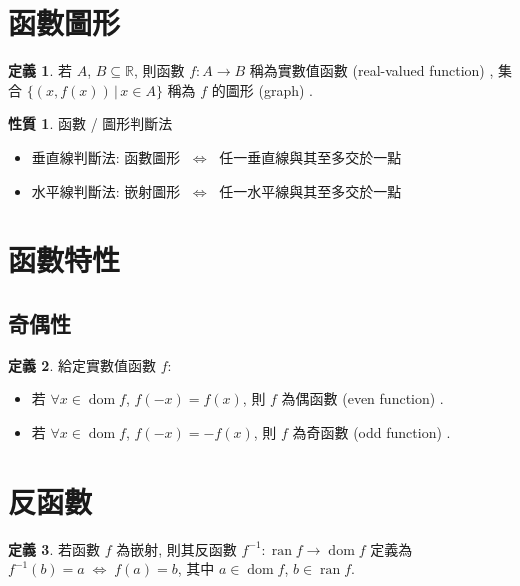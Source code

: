 \documentclass[12pt,a4paper]{extarticle}
\newcommand{\ifff}{\;\Longleftrightarrow\;}
\DeclareMathOperator*{\dom}{dom}
\DeclareMathOperator*{\ran}{ran}
\theoremstyle{definition}
\newtheorem*{dfn}{定義}
\newtheorem*{prp}{性質}
\begin{document}
\section*{函數圖形}

\begin{dfn}
  若 $A$, $B\subseteq\mathbb{R}$, 則函數 $f: A\to B$ 稱為實數值函數 (real-valued function) , 集合 $\{(x, f(x))\,|\,x\in A\}$ 稱為 $f$ 的圖形 (graph) . 
\end{dfn}

\begin{prp}函數 / 圖形判斷法
  \begin{itemize}\setlength\itemsep{0em}
    \item 垂直線判斷法: 函數圖形 $\ifff$ 任一垂直線與其至多交於一點
    \item 水平線判斷法: 嵌射圖形 $\ifff$ 任一水平線與其至多交於一點
  \end{itemize}
\end{prp}

\section*{函數特性}
\subsection*{奇偶性}
\begin{dfn} 給定實數值函數 $f$: 
  \begin{itemize}\setlength\itemsep{0em}
    \item 若 $\forall x\in\dom f$, $f(-x) = f(x)$, 則 $f$ 為偶函數 (even function) . 
    \item 若 $\forall x\in\dom f$, $f(-x) = -f(x)$, 則 $f$ 為奇函數 (odd function) . 
  \end{itemize}
\end{dfn}

\section*{反函數}

\begin{dfn}
  若函數 $f$ 為嵌射, 則其反函數 $f^{-1}:\ran f\to\dom f$ 定義為 $f^{-1}(b) = a \ifff f(a) = b$, 其中 $a\in\dom f$, $b\in\ran f$. 
\end{dfn}
\end{document}

